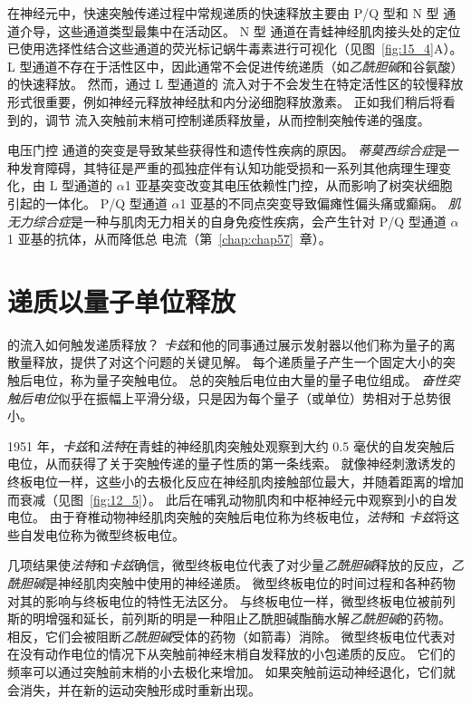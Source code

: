在神经元中，快速突触传递过程中常规递质的快速释放主要由 P/Q 型和 N 型  通道介导，这些通道类型最集中在活动区。
N 型  通道在青蛙神经肌肉接头处的定位已使用选择性结合这些通道的荧光标记蜗牛毒素进行可视化（见图~\ref{fig:15_4}A）。
L 型通道不存在于活性区中，因此通常不会促进传统递质（如\textit{乙酰胆碱}和谷氨酸）的快速释放。
然而，通过 L 型通道的  流入对于不会发生在特定活性区的较慢释放形式很重要，例如神经元释放神经肽和内分泌细胞释放激素。
正如我们稍后将看到的，调节  流入突触前末梢可控制递质释放量，从而控制突触传递的强度。


电压门控  通道的突变是导致某些获得性和遗传性疾病的原因。
\textit{蒂莫西综合症}是一种发育障碍，其特征是严重的孤独症伴有认知功能受损和一系列其他病理生理变化，由 L 型通道的 $\alpha$1 亚基突变改变其电压依赖性门控，从而影响了树突状细胞引起的一体化。
P/Q 型通道 $\alpha$1 亚基的不同点突变导致偏瘫性偏头痛或癫痫。
\textit{肌无力综合症}是一种与肌肉无力相关的自身免疫性疾病，会产生针对 P/Q 型通道 $\alpha$1 亚基的抗体，从而降低总  电流（第~\ref{chap:chap57}~章）。



\section{递质以量子单位释放}

的流入如何触发递质释放？
\textit{卡兹}和他的同事通过展示发射器以他们称为量子的离散量释放，提供了对这个问题的关键见解。
每个递质量子产生一个固定大小的突触后电位，称为量子突触电位。
总的突触后电位由大量的量子电位组成。
\textit{奋性突触后电位}似乎在振幅上平滑分级，只是因为每个量子（或单位）势相对于总势很小。


1951 年，\textit{卡兹}和\textit{法特}在青蛙的神经肌肉突触处观察到大约 0.5 毫伏的自发突触后电位，从而获得了关于突触传递的量子性质的第一条线索。
就像神经刺激诱发的终板电位一样，这些小的去极化反应在神经肌肉接触部位最大，并随着距离的增加而衰减（见图~\ref{fig:12_5}）。
此后在哺乳动物肌肉和中枢神经元中观察到小的自发电位。
由于脊椎动物神经肌肉突触的突触后电位称为终板电位，\textit{法特}和 \textit{卡兹}将这些自发电位称为微型终板电位。


几项结果使\textit{法特}和\textit{卡兹}确信，微型终板电位代表了对少量\textit{乙酰胆碱}释放的反应，\textit{乙酰胆碱}是神经肌肉突触中使用的神经递质。
微型终板电位的时间过程和各种药物对其的影响与终板电位的特性无法区分。
与终板电位一样，微型终板电位被前列斯的明增强和延长，前列斯的明是一种阻止乙酰胆碱酯酶水解\textit{乙酰胆碱}的药物。
相反，它们会被阻断\textit{乙酰胆碱}受体的药物（如箭毒）消除。 
微型终板电位代表对在没有动作电位的情况下从突触前神经末梢自发释放的小包递质的反应。
它们的频率可以通过突触前末梢的小去极化来增加。
如果突触前运动神经退化，它们就会消失，并在新的运动突触形成时重新出现。


